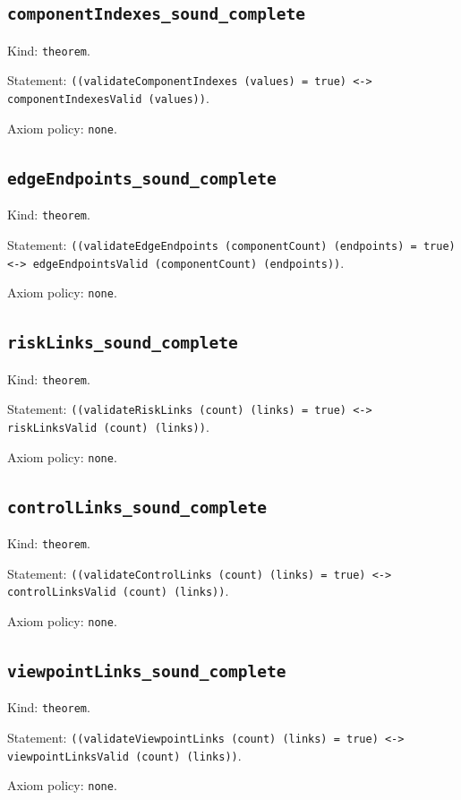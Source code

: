 \documentclass[11pt]{article}
\begin{document}
\subsection*{\texttt{componentIndexes\_sound\_complete}}
\noindent Kind: \texttt{theorem}.\par
\noindent Statement: \texttt{((validateComponentIndexes (values) = true) <-> componentIndexesValid (values))}.\par
\noindent Axiom policy: \texttt{none}.\par
\subsection*{\texttt{edgeEndpoints\_sound\_complete}}
\noindent Kind: \texttt{theorem}.\par
\noindent Statement: \texttt{((validateEdgeEndpoints (componentCount) (endpoints) = true) <-> edgeEndpointsValid (componentCount) (endpoints))}.\par
\noindent Axiom policy: \texttt{none}.\par
\subsection*{\texttt{riskLinks\_sound\_complete}}
\noindent Kind: \texttt{theorem}.\par
\noindent Statement: \texttt{((validateRiskLinks (count) (links) = true) <-> riskLinksValid (count) (links))}.\par
\noindent Axiom policy: \texttt{none}.\par
\subsection*{\texttt{controlLinks\_sound\_complete}}
\noindent Kind: \texttt{theorem}.\par
\noindent Statement: \texttt{((validateControlLinks (count) (links) = true) <-> controlLinksValid (count) (links))}.\par
\noindent Axiom policy: \texttt{none}.\par
\subsection*{\texttt{viewpointLinks\_sound\_complete}}
\noindent Kind: \texttt{theorem}.\par
\noindent Statement: \texttt{((validateViewpointLinks (count) (links) = true) <-> viewpointLinksValid (count) (links))}.\par
\noindent Axiom policy: \texttt{none}.\par
\end{document}
